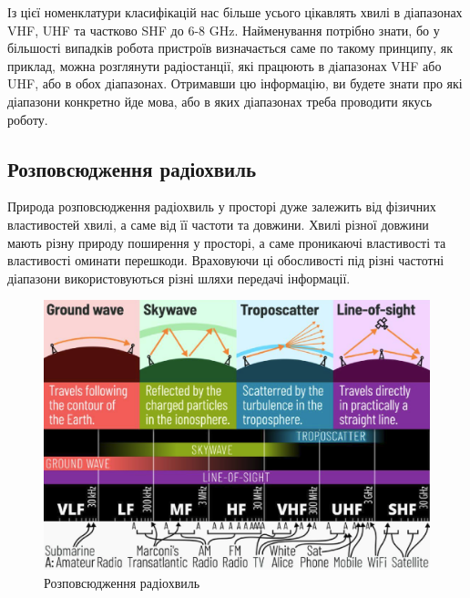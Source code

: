 \documentclass{article}
\begin{document}
Із цієї номенклатури класифікацій нас більше усього цікавлять хвилі в діапазонах VHF, UHF та частково SHF до 6-8 GHz.  Найменування потрібно знати, бо у більшості випадків робота пристроїв визначається саме по такому принципу, як приклад, можна розглянути радіостанції, які працюють в діапазонах VHF або UHF, або в обох діапазонах. Отримавши цю інформацію, ви будете знати про які діапазони конкретно йде мова, або в яких діапазонах треба проводити якусь роботу.


\subsection{Розповсюдження радіохвиль}

Природа розповсюдження радіохвиль у просторі дуже залежить від фізичних властивостей хвилі, а саме від її частоти та довжини. Хвилі різної довжини мають різну природу поширення у просторі, а саме проникаючі властивості та властивості оминати перешкоди. Враховуючи ці обосливості під різні частотні діапазони використовуються різні шляхи передачі інформації.

\begin{figure}[h!]
	\centering
	\includegraphics[width=0.8\linewidth]{images/radio-propagation.png}
	\caption{\label{fig:radio-propagation} Розповсюдження радіохвиль}
\end{figure}
\end{document}
